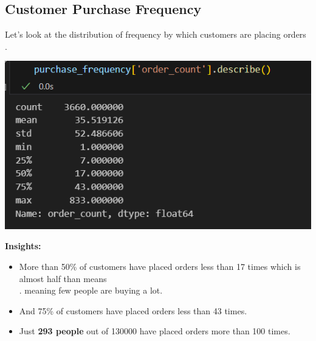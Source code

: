 \documentclass{article}
\begin{document}
    \subsection{Customer Purchase Frequency}
    Let's look at the distribution of frequency by which customers are placing orders .{
        \begin{center}
            \includegraphics[width=1\columnwidth]{images/order-count.png}
        \end{center}
        \begin{tcolorbox}[colback=lightRed!5!white,colframe=lightRed!75!black,title=Insights]
            \textbf{Insights:}
            \begin{itemize}
                \item More than 50\% of customers have placed orders less than 17 times which is almost half than means\\.
                meaning few people are buying a lot.
                \item And 75\% of customers have placed orders less than 43 times.
                \item Just \textbf{293 people} out of 130000 have placed orders more than 100 times.
            \end{itemize}
        \end{tcolorbox}
    }
\end{document}
